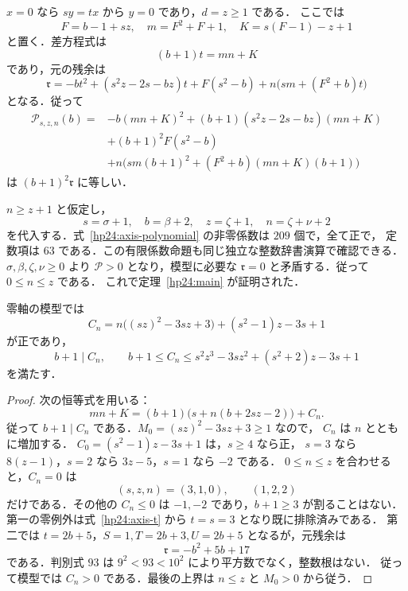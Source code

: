 $x=0$ なら $sy=tx$ から $y=0$ であり，$d=z\ge1$ である．
ここでは
\[
 F=b-1+sz,\quad m=F^2+F+1,\quad K=s(F-1)-z+1
\]
と置く．差方程式は
\begin{equation}\label{hp24:axis-t}
 (b+1)t=mn+K
\end{equation}
であり，元の残余は
\begin{equation}\label{hp24:axis-r}
 \mathfrak r=-bt^2+(s^2z-2s-bz)t+F(s^2-b)
       +n\bigl(sm+(F^2+b)t\bigr)
\end{equation}
となる．従って
\begin{equation}\label{hp24:axis-polynomial}
\begin{aligned}
\mathcal P_{s,z,n}(b)={}&-b(mn+K)^2
 +(b+1)(s^2z-2s-bz)(mn+K)\\
 &+(b+1)^2F(s^2-b)\\
 &+n\bigl(s m(b+1)^2+(F^2+b)(mn+K)(b+1)\bigr)
\end{aligned}
\end{equation}
は $(b+1)^2\mathfrak r$ に等しい．

$n\ge z+1$ と仮定し，
\[
 s=\sigma+1,\quad b=\beta+2,\quad z=\zeta+1,
 \quad n=\zeta+\nu+2
\]
を代入する．式~\eqref{hp24:axis-polynomial} の非零係数は $209$ 個で，全て正で，
定数項は $63$ である．この有限係数命題も同じ独立な整数辞書演算で確認できる．
$\sigma,\beta,\zeta,\nu\ge0$ より $\mathcal P>0$ となり，模型に必要な
$\mathfrak r=0$ と矛盾する．従って $0\le n\le z$ である．
これで定理~\ref{hp24:main} が証明された．

\begin{lemma}[整除余りの共鳴と明示上界]
\label{hp24:divisor-bound}
零軸の模型では
\[
 C_n=n\bigl((sz)^2-3sz+3\bigr)+(s^2-1)z-3s+1
\]
が正であり，
\begin{equation}\label{hp24:divisor-bound-formula}
 b+1\mid C_n,\qquad b+1\le C_n\le
 s^2z^3-3sz^2+(s^2+2)z-3s+1
\end{equation}
を満たす．
\end{lemma}

\begin{proof}
次の恒等式を用いる：
\[
 mn+K=(b+1)\bigl(s+n(b+2sz-2)\bigr)+C_n.
\]
従って $b+1\mid C_n$ である．$M_0=(sz)^2-3sz+3\ge1$ なので，
$C_n$ は $n$ とともに増加する．
$C_0=(s^2-1)z-3s+1$ は，$s\ge4$ なら正，
$s=3$ なら $8(z-1)$，$s=2$ なら $3z-5$，$s=1$ なら $-2$ である．
$0\le n\le z$ を合わせると，$C_n=0$ は
\[
 (s,z,n)=(3,1,0),\qquad (1,2,2)
\]
だけである．その他の $C_n\le0$ は $-1,-2$ であり，$b+1\ge3$ が割ることはない．
第一の零例外は式~\eqref{hp24:axis-t} から $t=s=3$ となり既に排除済みである．
第二では $t=2b+5$，$S=1,T=2b+3,U=2b+5$ となるが，元残余は
\[
 \mathfrak r=-b^2+5b+17
\]
である．判別式 $93$ は $9^2<93<10^2$ により平方数でなく，整数根はない．
従って模型では $C_n>0$ である．最後の上界は $n\le z$ と $M_0>0$ から従う．
\end{proof}

